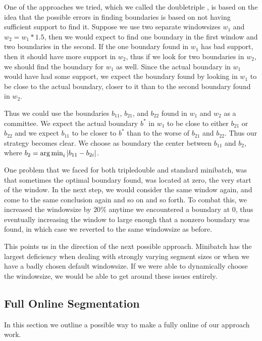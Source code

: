 One of the approaches we tried, which we called the doubletriple  , is based on the idea that the possible errors in finding boundaries is based on not having sufficient support to find it. Suppose we use two separate windowsizes $w_1$ and $w_2=w_1*1.5$, then we would expect to find one boundary in the first window and two boundaries in the second. If the one boundary found in $w_1$ has bad support, then it should have more support in $w_2$, thus if we look for two boundaries in $w_2$, we should find the boundary for $w_1$ as well. Since the actual boundary in $w_1$ would have had some support, we expect the boundary found by looking in $w_1$ to be close to the actual boundary, closer to it than to the second boundary found in $w_2$.

Thus we could use the boundaries $b_{11}$, $b_{21}$, and $b_{22}$ found in $w_1$ and $w_2$ as a committee. We expect the actual boundary $b^*$ in $w_1$ to be close to either $b_{21}$ or $b_{22}$ and we expect $b_{11}$ to be closer to $b^*$ than to the worse of $b_{21}$ and $b_{22}$. Thus our strategy becomes clear. We choose as boundary the center between $b_{11}$ and $b_{2}$, where $b_2=\operatorname*{arg\,min}_{i} |b_{11}-b_{2i}|$. 


One problem that we faced for both tripledouble and standard minibatch, was that sometimes the optimal boundary found, was located at zero, the very start of the window. In the next step, we would consider the same window again, and come to the same conclusion again and so on and so forth. To combat this, we increased the windowsize by $20\%$ anytime we encountered a boundary at $0$, thus eventually increasing the window to large enough that a nonzero boundary was found, in which case we reverted to the same windowsize as before.

This points us in the direction of the next possible approach. Minibatch has the largest deficiency when dealing with strongly varying segment sizes or when we have a badly chosen default windowsize. If we were able to dynamically choose the windowsize, we would be able to get around these issues entirely. 

\subsection{Full Online Segmentation}
In this section we outline a possible way to make a fully online of our approach work.

